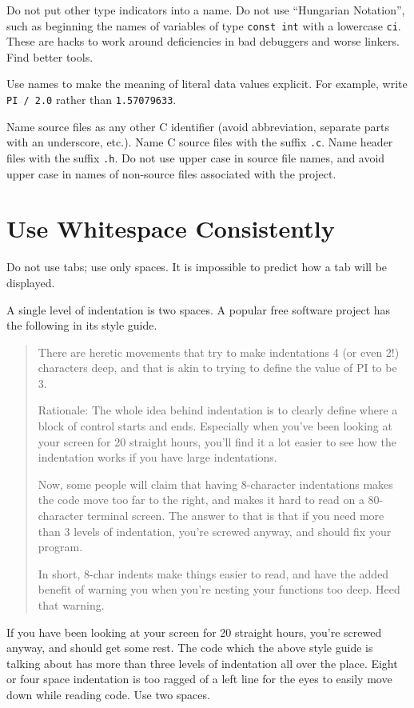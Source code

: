 \documentclass{lulu}
\newcommand{\code}[1]{\texttt{#1}\xspace}
\begin{document}
Do not put other type indicators into a name.  Do not use ``Hungarian
Notation'', such as beginning the names of variables of type
\code{const int} with a lowercase \code{ci}.  These are hacks to work
around deficiencies in bad debuggers and worse linkers.  Find better
tools.

Use names to make the meaning of literal data values explicit.  For
example, write \code{PI / 2.0} rather than \code{1.57079633}.

Name source files as any other C identifier (avoid abbreviation,
separate parts with an underscore, etc.).  Name C source files with
the suffix \code{.c}.  Name header files with the suffix \code{.h}.
Do not use upper case in source file names, and avoid upper case in
names of non-source files associated with the project.

\section{Use Whitespace Consistently}

Do not use tabs; use only spaces.  It is impossible to predict how a
tab will be displayed.

A single level of indentation is two spaces.  A popular free software
project has the following in its style guide.

\begin{quote}
There are heretic movements that try to make indentations 4 (or even
2!) characters deep, and that is akin to trying to define the value of
PI to be 3.

Rationale: The whole idea behind indentation is to clearly define
where a block of control starts and ends. Especially when you've been
looking at your screen for 20 straight hours, you'll find it a lot
easier to see how the indentation works if you have large
indentations.

Now, some people will claim that having 8-character indentations makes
the code move too far to the right, and makes it hard to read on a
80-character terminal screen. The answer to that is that if you need
more than 3 levels of indentation, you're screwed anyway, and should
fix your program.

In short, 8-char indents make things easier to read, and have the
added benefit of warning you when you're nesting your functions too
deep. Heed that warning.
\end{quote}

If you have been looking at your screen for 20 straight hours, you're
screwed anyway, and should get some rest.  The code which the above
style guide is talking about has more than three levels of indentation
all over the place.  Eight or four space indentation is too ragged of
a left line for the eyes to easily move down while reading code.  Use
two spaces.
\end{document}
